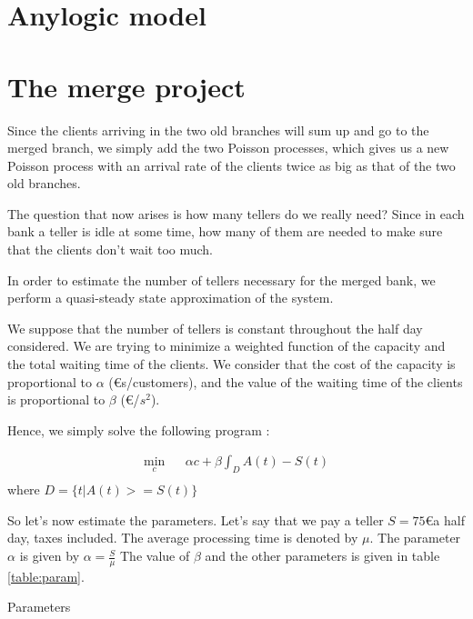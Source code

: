 \documentclass[12pt,a4paper,notitlepage]{report}
\begin{document}
\section*{Anylogic model}


\section*{The merge project}
 Since the clients arriving in the two old branches will sum up and go to the merged branch, we simply add the two Poisson processes, which gives us a new Poisson process with an arrival rate of the clients twice as big as that of the two old branches.

The question that now arises is how many tellers do we really need? Since in each bank a teller is idle at some time, how many of them are needed to make sure that the clients don't wait too much.


In order to estimate the number of tellers necessary for the merged bank, we perform a quasi-steady state approximation of the system. 

We suppose that the number of tellers is constant throughout the half day considered.
We are trying to minimize a weighted function of the capacity and the total waiting time of the clients.
We consider that the cost of the capacity is proportional to $ \alpha$ (\euro s/customers), and the value of the waiting time of the clients is proportional to $\beta$ (\euro/$s^2$).

Hence, we simply solve the following program :

\begin{eqnarray*}
\min_c & & \alpha c + \beta \int_D A(t)-S(t)\\
\end{eqnarray*}
where $D = \{t | A(t)>=S(t) \}$

So let's now estimate the parameters. Let's say that we pay a teller $S = 75$\euro  a half day, taxes included.
The average processing time is denoted by $\mu$. 
The parameter $\alpha$ is given by $\alpha = \frac{S}{\mu}$
The value of $\beta$ and the other parameters is given in table \ref{table:param}.
\begin{table}

\caption{Parameters\label{table:param}}
\end{table}
\end{document}
